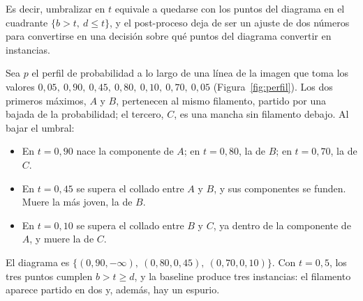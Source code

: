 Es decir, umbralizar en $t$ equivale a quedarse con los puntos del
diagrama en el cuadrante $\{b>t,\ d\le t\}$, y el post-proceso deja de
ser un ajuste de dos números para convertirse en una decisión sobre qué
puntos del diagrama convertir en instancias.

\begin{ejemplo}
\label{ej:perfil}
Sea $p$ el perfil de probabilidad a lo largo de una línea de la imagen
que toma los valores
$0{,}05,\ 0{,}90,\ 0{,}45,\ 0{,}80,\ 0{,}10,\ 0{,}70,\ 0{,}05$
(Figura~\ref{fig:perfil}). Los dos primeros máximos, $A$ y $B$,
pertenecen al mismo filamento, partido por una bajada de la
probabilidad; el tercero, $C$, es una mancha sin filamento debajo. Al
bajar el umbral:
\begin{itemize}
  \item En $t=0{,}90$ nace la componente de $A$; en $t=0{,}80$, la de
  $B$; en $t=0{,}70$, la de $C$.
  \item En $t=0{,}45$ se supera el collado entre $A$ y $B$, y sus
  componentes se funden. Muere la más joven, la de $B$.
  \item En $t=0{,}10$ se supera el collado entre $B$ y $C$, ya dentro de
  la componente de $A$, y muere la de $C$.
\end{itemize}
El diagrama es $\{(0{,}90,-\infty),\ (0{,}80,0{,}45),\ (0{,}70,0{,}10)\}$.
Con $t=0{,}5$, los tres puntos cumplen $b>t\ge d$, y la baseline produce
tres instancias: el filamento aparece partido en dos y, además, hay un
espurio.
\end{ejemplo}

